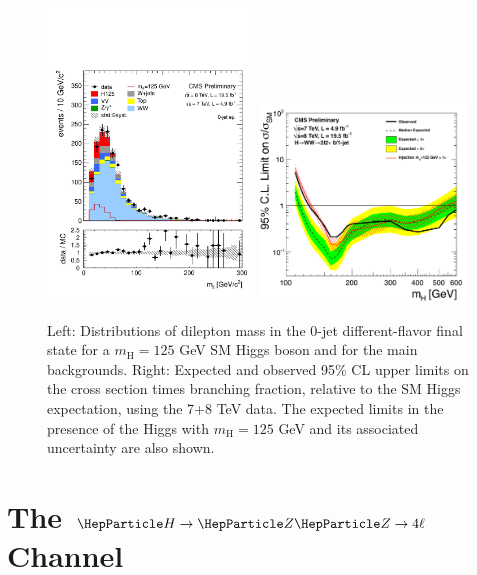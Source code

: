 \documentclass{cimento}
\newcommand{\mH}{\ensuremath{m_{\mathrm{H}}}\xspace}
\newcommand{\cPZ}{\PZ} %
\newcommand{\hzzfl}{\ensuremath{\PH\to\cPZ\cPZ\to4\ell}}
\begin{document}
\begin{figure}[htbp]
  \begin{center}
    \includegraphics[width=0.49\textwidth,height=0.32\textheight]{mll_0j_of_nomll_Hsel_mll_Lin.pdf}
    \includegraphics[width=0.49\textwidth,height=0.32\textheight]{limit_7p8TeV_shape_from110to600_logx1_logy1.pdf}
      \caption{Left: Distributions of dilepton mass in the 0-jet
	different-flavor final state for a $\mH=125$ GeV SM Higgs
	boson and for the main backgrounds.  Right: Expected and
	observed 95\% CL upper limits on the cross section times
	branching fraction, relative to the SM Higgs expectation,
	using the 7+8 TeV data. The expected limits in the presence
	of the Higgs with $\mH = 125$ GeV and its associated
	uncertainty are also shown. \label{fig:hww1}} \end{center}
\end{figure}


\section{The $\hzzfl$ Channel}
\label{sec:hzzfl}
\end{document}

